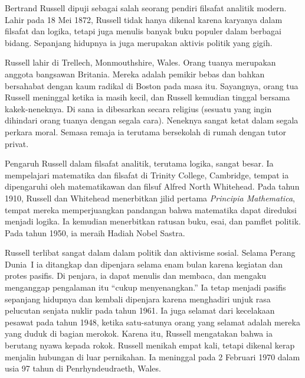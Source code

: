 \documentclass[../../../include/open-logic-section]{subfiles}
\begin{document}



Bertrand Russell dipuji sebagai salah seorang pendiri filsafat analitik
modern. Lahir pada 18 Mei 1872, Russell tidak hanya dikenal karena karyanya
dalam filsafat dan logika, tetapi juga menulis banyak buku populer dalam
berbagai bidang. Sepanjang hidupnya ia juga merupakan aktivis politik yang
gigih.

Russell lahir di Trellech, Monmouthshire, Wales. Orang tuanya merupakan
anggota bangsawan Britania. Mereka adalah pemikir bebas dan bahkan
bersahabat dengan kaum radikal di Boston pada masa itu. Sayangnya, orang tua
Russell meninggal ketika ia masih kecil, dan Russell kemudian tinggal
bersama kakek-neneknya. Di sana ia dibesarkan secara religius (sesuatu yang
ingin dihindari orang tuanya dengan segala cara). Neneknya sangat ketat
dalam segala perkara moral. Semasa remaja ia terutama bersekolah di rumah
dengan tutor privat.

Pengaruh Russell dalam filsafat analitik, terutama logika, sangat besar. Ia
mempelajari matematika dan filsafat di Trinity College, Cambridge, tempat ia
dipengaruhi oleh matematikawan dan filsuf Alfred North Whitehead. Pada tahun
1910, Russell dan Whitehead menerbitkan jilid pertama \emph{Principia
Mathematica}, tempat mereka memperjuangkan pandangan bahwa matematika dapat
direduksi menjadi logika. Ia kemudian menerbitkan ratusan buku, esai, dan
pamflet politik. Pada tahun 1950, ia meraih Hadiah Nobel Sastra.

Russell terlibat sangat dalam dalam politik dan aktivisme sosial. Selama
Perang Dunia~I ia ditangkap dan dipenjara selama enam bulan karena kegiatan
dan protes pasifis. Di penjara, ia dapat menulis dan membaca, dan mengaku
menganggap pengalaman itu ``cukup menyenangkan.'' Ia tetap menjadi pasifis
sepanjang hidupnya dan kembali dipenjara karena menghadiri unjuk rasa
pelucutan senjata nuklir pada tahun 1961. Ia juga selamat dari kecelakaan
pesawat pada tahun 1948, ketika satu-satunya orang yang selamat adalah mereka
yang duduk di bagian merokok. Karena itu, Russell mengatakan bahwa ia
berutang nyawa kepada rokok. Russell menikah empat kali, tetapi dikenal
kerap menjalin hubungan di luar pernikahan. Ia meninggal pada 2 Februari
1970 dalam usia 97 tahun di Penrhyndeudraeth, Wales.
\end{document}
